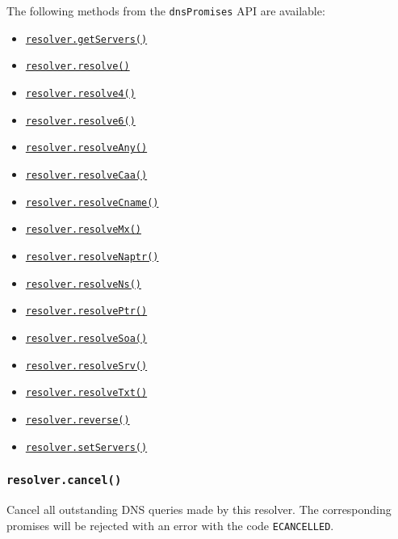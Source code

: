 The following methods from the \texttt{dnsPromises} API are available:

\begin{itemize}
\tightlist
\item
  \hyperref[dnspromisesgetservers]{\texttt{resolver.getServers()}}
\item
  \hyperref[dnspromisesresolvehostname-rrtype]{\texttt{resolver.resolve()}}
\item
  \hyperref[dnspromisesresolve4hostname-options]{\texttt{resolver.resolve4()}}
\item
  \hyperref[dnspromisesresolve6hostname-options]{\texttt{resolver.resolve6()}}
\item
  \hyperref[dnspromisesresolveanyhostname]{\texttt{resolver.resolveAny()}}
\item
  \hyperref[dnspromisesresolvecaahostname]{\texttt{resolver.resolveCaa()}}
\item
  \hyperref[dnspromisesresolvecnamehostname]{\texttt{resolver.resolveCname()}}
\item
  \hyperref[dnspromisesresolvemxhostname]{\texttt{resolver.resolveMx()}}
\item
  \hyperref[dnspromisesresolvenaptrhostname]{\texttt{resolver.resolveNaptr()}}
\item
  \hyperref[dnspromisesresolvenshostname]{\texttt{resolver.resolveNs()}}
\item
  \hyperref[dnspromisesresolveptrhostname]{\texttt{resolver.resolvePtr()}}
\item
  \hyperref[dnspromisesresolvesoahostname]{\texttt{resolver.resolveSoa()}}
\item
  \hyperref[dnspromisesresolvesrvhostname]{\texttt{resolver.resolveSrv()}}
\item
  \hyperref[dnspromisesresolvetxthostname]{\texttt{resolver.resolveTxt()}}
\item
  \hyperref[dnspromisesreverseip]{\texttt{resolver.reverse()}}
\item
  \hyperref[dnspromisessetserversservers]{\texttt{resolver.setServers()}}
\end{itemize}

\subsubsection{\texorpdfstring{\texttt{resolver.cancel()}}{resolver.cancel()}}\label{resolver.cancel-1}

Cancel all outstanding DNS queries made by this resolver. The
corresponding promises will be rejected with an error with the code
\texttt{ECANCELLED}.

